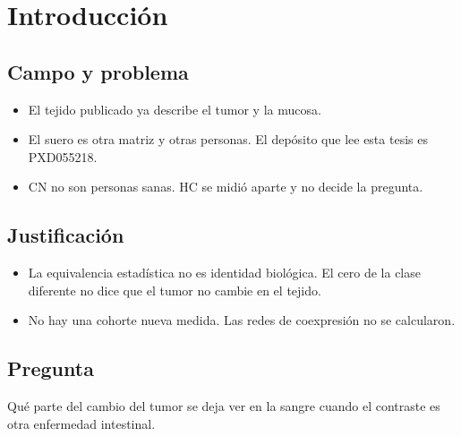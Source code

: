 \chapter{Introducción}

\section{Campo y problema}
\begin{itemize}
\item El tejido publicado ya describe el tumor y la mucosa. \cite{vasaikar2019,zhang2014,tanaka2024}
\item El suero es otra matriz y otras personas. El depósito que lee esta tesis es PXD055218. \cite{rai2025}
\item CN no son personas sanas. HC se midió aparte y no decide la pregunta.
\end{itemize}

\section{Justificación}
\begin{itemize}
\item La equivalencia estadística no es identidad biológica. El cero de la clase diferente no dice que el tumor no cambie en el tejido.
\item No hay una cohorte nueva medida. Las redes de coexpresión no se calcularon.
\end{itemize}

\section{Pregunta}
Qué parte del cambio del tumor se deja ver en la sangre cuando el contraste es otra enfermedad intestinal.

